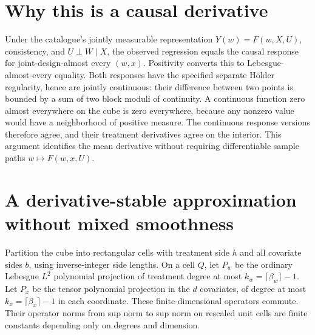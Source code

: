 \documentclass[11pt]{article}
\theoremstyle{remark}\newtheorem{remark}[theorem]{Remark}
\begin{document}
\section{Why this is a causal derivative}
Under the catalogue's jointly measurable representation $Y(w)=F(w,X,U)$, consistency, and $U\perp W\mid X$, the observed regression equals the causal response for joint-design-almost every $(w,x)$. Positivity converts this to Lebesgue-almost-every equality. Both responses have the specified separate H\"older regularity, hence are jointly continuous: their difference between two points is bounded by a sum of two block moduli of continuity. A continuous function zero almost everywhere on the cube is zero everywhere, because any nonzero value would have a neighborhood of positive measure. The continuous response versions therefore agree, and their treatment derivatives agree on the interior. This argument identifies the mean derivative without requiring differentiable sample paths $w\mapsto F(w,x,U)$.

\section{A derivative-stable approximation without mixed smoothness}
Partition the cube into rectangular cells with treatment side $h$ and all covariate sides $b$, using inverse-integer side lengths. On a cell $Q$, let $P_w$ be the ordinary Lebesgue $L^2$ polynomial projection of treatment degree at most $k_w=\lceil\beta_w\rceil-1$. Let $P_x$ be the tensor polynomial projection in the $d$ covariates, of degree at most $k_x=\lceil\beta_x\rceil-1$ in each coordinate. These finite-dimensional operators commute. Their operator norms from sup norm to sup norm on rescaled unit cells are finite constants depending only on degrees and dimension.
\end{document}
